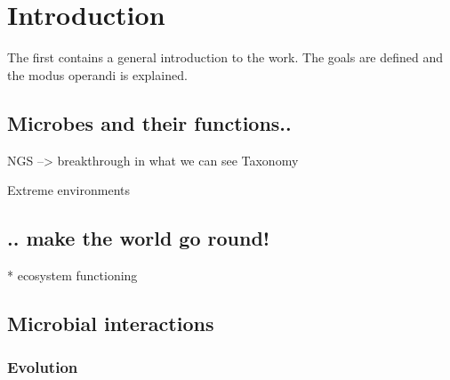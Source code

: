 \chapter{Introduction}
\label{cha:intro}
The first contains a general introduction to the work. The goals are
defined and the modus operandi is explained.



\section{Microbes and their functions..}

NGS --> breakthrough in what we can see
Taxonomy


Extreme environments


\section{.. make the world go round!}

* ecosystem functioning


\section{Microbial interactions}

\subsection*{Evolution}


